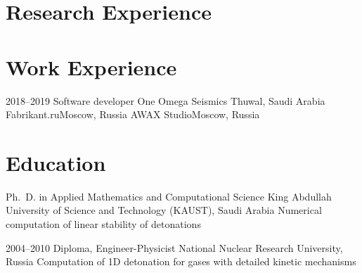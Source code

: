 \documentclass[11pt,a4paper,sans]{moderncv}
\begin{document}
\makecvtitle%


\section{Research Experience}



\section{Work Experience}

\cventry
{2018--2019}
{Software developer}
{One Omega Seismics}
{Thuwal, Saudi Arabia}
{}
{}
{Fabrikant.ru}{Moscow, Russia}{}{}
{AWAX Studio}{Moscow, Russia}{}{}


\section{Education}

        {Ph.\ D. in Applied Mathematics and Computational Science}
        {King Abdullah University of Science and Technology (KAUST), Saudi
          Arabia}
        {}{}{}
       {Numerical computation of linear stability of detonations}

\cventry
  {2004--2010}
  {Diploma, Engineer-Physicist}
  {National Nuclear Research University, Russia}{}{}{}
       {Computation of 1D detonation for
        gases with detailed kinetic mechanisms}
\end{document}
